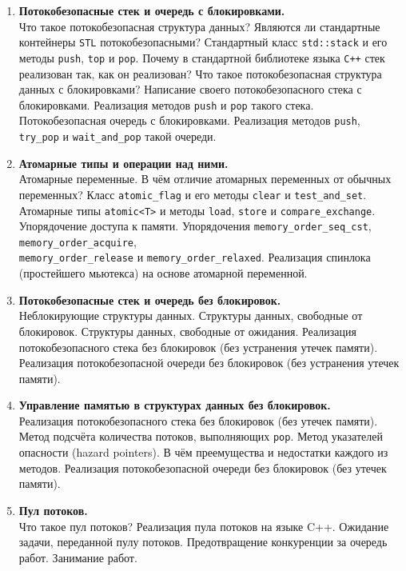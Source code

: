 \documentclass{article}
\begin{document}
\begin{enumerate}
\item \textbf{Потокобезопасные стек и очередь с блокировками.}\\
Что такое потокобезопасная структура данных? Являются ли стандартные контейнеры \texttt{STL} потокобезопасными?
Стандартный класс \texttt{std::stack} и его методы \texttt{push}, \texttt{top} и \texttt{pop}. Почему в стандартной библиотеке языка \texttt{C++} стек реализован так, как он реализован? Что такое потокобезопасная структура данных с блокировками? Написание своего потокобезопасного стека с блокировками. Реализация методов \texttt{push} и \texttt{pop} такого стека. Потокобезопасная очередь с блокировками. Реализация методов \texttt{push}, \texttt{try\_pop} и \texttt{wait\_and\_pop} такой очереди.

\item \textbf{Атомарные типы и операции над ними.}\\
Атомарные переменные. В чём отличие атомарных переменных от обычных переменных? Класс \texttt{atomic\_flag} и его методы \texttt{clear} и \texttt{test\_and\_set}. Атомарные типы \texttt{atomic<T>} и методы \texttt{load}, \texttt{store} и \texttt{compare\_exchange}. Упорядочение доступа к памяти. Упорядочения \texttt{memory\_order\_seq\_cst}, \texttt{memory\_order\_acquire}, \\ \texttt{memory\_order\_release} и \texttt{memory\_order\_relaxed}. Реализация спинлока (простейшего мьютекса) на основе атомарной переменной.


\item \textbf{Потокобезопасные стек и очередь без блокировок.}\\
Неблокирующие структуры данных. Структуры данных, свободные от блокировок. Структуры данных, свободные от ожидания. Реализация потокобезопасного стека без блокировок (без устранения утечек памяти). Реализация потокобезопасной очереди без блокировок (без устранения утечек памяти). 

\item \textbf{Управление памятью в структурах данных без блокировок.}\\
Реализация потокобезопасного стека без блокировок (без утечек памяти). Метод подсчёта количества потоков, выполняющих \texttt{pop}. Метод указателей опасности (hazard pointers). В чём преемущества и недостатки каждого из методов. Реализация потокобезопасной очереди без блокировок (без утечек памяти). 

\item \textbf{Пул потоков.}\\
Что такое пул потоков? Реализация пула потоков на языке C++.
Ожидание задачи, переданной пулу потоков.
Предотвращение конкуренции за очередь работ. Занимание работ.


\end{enumerate}
\end{document}

